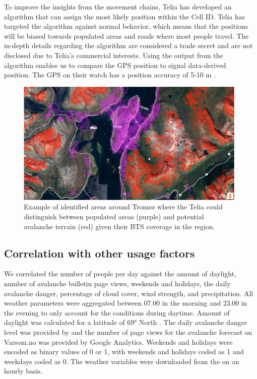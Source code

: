 \documentclass[authordate,empirical]{jote-new-article}
\begin{document}
To improve the insights from the movement chains, Telia has developed an algorithm that can assign the most likely position within the Cell ID. Telia has targeted the algorithm against normal behavior, which means that the positions will be biased towards populated areas and roads where most people travel. The in-depth details regarding the algorithm are considered a trade secret and are not disclosed due to Telia's commercial interests. Using the output from the algorithm enables us to compare the GPS position to signal data-derived position. The GPS on their watch has a position accuracy of 5-10 m \parencites{Wing2005}.




\begin{figure}[t]
  \begin{fullwidth}



    \includegraphics[width=\linewidth]{media/image4.jpg}
    \caption{Example of identified areas around Tromsø where the Telia could distinguish between populated areas (purple) and potential avalanche terrain (red) given their BTS coverage in the region.}
    \label{fig:rId11}

  \end{fullwidth}
\end{figure}


\subsection{Correlation with other usage factors }



We correlated the number of people per day against the amount of daylight, number of avalanche bulletin page views, weekends and holidays, the daily avalanche danger, percentage of cloud cover, wind strength, and precipitation. All weather parameters were aggregated between 07.00 in the morning and 23.00 in the evening to only account for the conditions during daytime. Amount of daylight was calculated for a latitude of 69° North \parencites{SatAgro2019}. The daily avalanche danger level was provided by \textcite{Varsom2021} and the number of page views for the avalanche forecast on Varsom.no was provided by Google Analytics. Weekends and holidays were encoded as binary values of 0 or 1, with weekends and holidays coded as 1 and weekdays coded as 0. The weather variables were downloaded from the \textcites{NorwegianCentreforClimateServices2021} on an hourly basis.
\end{document}
